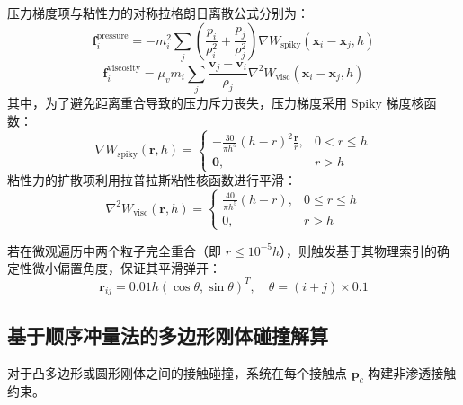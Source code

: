 \documentclass[11pt,a4paper]{article}
\begin{document}
压力梯度项与粘性力的对称拉格朗日离散公式分别为：
\begin{equation}
\mathbf{f}_i^{\text{pressure}} = -m_i^2 \sum_j \left( \frac{p_i}{\rho_i^2} + \frac{p_j}{\rho_j^2} \right) \nabla W_{\text{spiky}}(\mathbf{x}_i - \mathbf{x}_j, h)
\end{equation}
\begin{equation}
\mathbf{f}_i^{\text{viscosity}} = \mu_v m_i \sum_j \frac{\mathbf{v}_j - \mathbf{v}_i}{\rho_j} \nabla^2 W_{\text{visc}}(\mathbf{x}_i - \mathbf{x}_j, h)
\end{equation}
其中，为了避免距离重合导致的压力斥力丧失，压力梯度采用 $\text{Spiky}$ 梯度核函数：
\begin{equation}
\nabla W_{\text{spiky}}(\mathbf{r}, h) = 
\begin{cases}
-\frac{30}{\pi h^5} (h - r)^2 \frac{\mathbf{r}}{r}, & 0 < r \le h \\
\mathbf{0}, & r > h
\end{cases}
\end{equation}
粘性力的扩散项利用拉普拉斯粘性核函数进行平滑：
\begin{equation}
\nabla^2 W_{\text{visc}}(\mathbf{r}, h) = 
\begin{cases}
\frac{40}{\pi h^5} (h - r), & 0 \le r \le h \\
0, & r > h
\end{cases}
\end{equation}

若在微观遍历中两个粒子完全重合（即 $r \le 10^{-5}h$），则触发基于其物理索引的确定性微小偏置角度，保证其平滑弹开：
\begin{equation}
\mathbf{r}_{ij} = 0.01 h \left( \cos\theta, \sin\theta \right)^T, \quad \theta = (i + j) \times 0.1
\end{equation}

\subsection{基于顺序冲量法的多边形刚体碰撞解算}
对于凸多边形或圆形刚体之间的接触碰撞，系统在每个接触点 $\mathbf{p}_c$ 构建非渗透接触约束。
\end{document}
